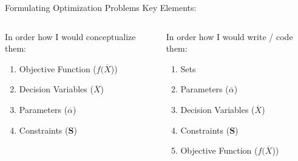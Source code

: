 \documentclass[10pt, aspectratio=169]{beamer}
\begin{document}
\begin{frame}{Formulating Optimization Problems}
    Key Elements:
    \vspace{0.5cm}
    \begin{columns}[t]
        \begin{column}[t]{0.5\textwidth}
            In order how I would conceptualize them:
            \begin{enumerate}
                \item Objective Function ($f(\overline{X}$))
                \item Decision Variables ($\overline{X}$)
                \item Parameters ($\overline{\alpha}$)
                \item Constraints ($\textbf{S}$)
            \end{enumerate}
        \end{column}
        \begin{column}[t]{0.5\textwidth}
            In order how I would write / code them:
            \begin{enumerate}
                \item Sets
                \item Parameters ($\overline{\alpha}$)
                \item Decision Variables ($\overline{X}$)
                \item Constraints ($\textbf{S}$)
                \item Objective Function ($f(\overline{X}$))
            \end{enumerate}
        \end{column}
    \end{columns}
\end{frame}
\end{document}
